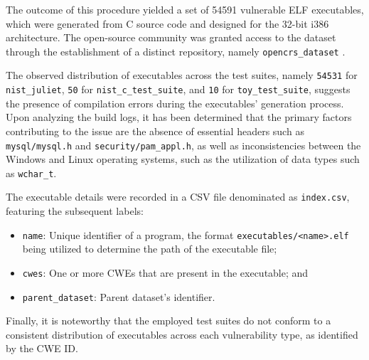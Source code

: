 \documentclass[../main.tex]{subfiles}
\begin{document}
The outcome of this procedure yielded a set of 54591 vulnerable ELF
executables, which were generated from C source code and designed for the
32-bit i386 architecture. The open-source community was granted access to the
dataset through the establishment of a distinct repository, namely
\texttt{opencrs\_dataset} \cite{opencrs_dataset}.

The observed distribution of executables across the test suites, namely
\texttt{54531} for \texttt{nist\_juliet}, \texttt{50} for
\texttt{nist\_c\_test\_suite}, and \texttt{10} for \texttt{toy\_test\_suite},
suggests the presence of compilation errors during the executables' generation
process. Upon analyzing the build logs, it has been determined that the primary
factors contributing to the issue are the absence of essential headers such as
\texttt{mysql/mysql.h} and \texttt{security/pam\_appl.h}, as well as
inconsistencies between the Windows and Linux operating systems, such as the
utilization of data types such as \texttt{wchar\_t}.

The executable details were recorded in a CSV file denominated as
\texttt{index.csv}, featuring the subsequent labels:

\begin{itemize}
  \tightlist
  \item
        \texttt{name}: Unique identifier of a program, the format
        \texttt{executables/\textless{}name\textgreater{}.elf} being utilized to
        determine the path of the executable file;
  \item
        \texttt{cwes}: One or more CWEs that are present in the executable;
        and
  \item
        \texttt{parent\_dataset}: Parent dataset's identifier.
\end{itemize}

Finally, it is noteworthy that the employed test suites do not conform to a
consistent distribution of executables across each vulnerability type, as
identified by the CWE ID.
\end{document}
